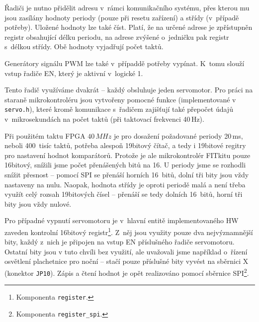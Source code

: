 Řadiči je nutno přidělit adresu v~rámci komunikačního systému, přes kterou mu
jsou zasílány hodnoty periody (pouze při resetu zařízení) a střídy (v~případě
potřeby). Uložené hodnoty lze také číst. Platí, že na určené adrese je
zpřístupněn registr obsahující délku periodu, na adrese zvýšené o~jedničku pak
registr s~délkou střídy. Obě hodnoty vyjadřují počet taktů.

Generátory signálu PWM lze také v~případdě potřeby vypínat. K~tomu slouží vstup
řadiče EN, který je aktivní v~logické 1.

Tento řadič využíváme dvakrát -- každý obsluhuje jeden servomotor. Pro práci na
staraně mikrokontroléru jsou vytvořeny pomocné funkce (implementované v
\texttt{servo.h}), které kromě komunikace s~řadičem zajišťují také přepočet
údajů v~mikrosekundách na počet taktů (při taktovací frekvenci 40\,Hz).

Při použitém taktu FPGA $40\,MHz$ je pro dosažení požadované periody 20\,ms,
neboli 400~tisíc taktů, potřeba alespoň 19bitový čítač, a tedy i 19bitové
regitry pro nastavení hodnot komparátorů. Protože je ale mikrokontrolér FITkitu
pouze 16bitový, snížili jsme počet přenášených bitů na 16. U periody jsme se
rozhodli snížit přesnost -- pomocí SPI se přenáší horních 16~bitů, dolní tři
bity jsou vždy nastaveny na nulu. Naopak, hodnota střídy je oproti periodě malá
a není třeba využít celý rozsah 19bitových čísel -- přenáší se tedy dolních
16~bitů, horní tři bity jsou vždy nulové.

Pro případné vypnutí servomotoru je v~hlavní entitě implementovaného HW zaveden
kontrolní 16bitový registr\footnote{Komponenta \texttt{register}.}. Z~něj jsou
využity pouze dva nejvýznamnější bity, každý z~nich je připojen na vstup EN
příslušného řadiče servomotoru. Ostatní bity jsou v tuto chvíli bez využití, ale
uvažovali jsme například o~řízení osvětlení plachetnice pro noční  --
stačí pouze příslušné bity vyvést na sběrnici X (konektor \texttt{JP10}). Zápis
a čtení hodnot je opět realizováno pomocí sběrnice SPI\footnote{Komponenta
\texttt{register\_spi}.}.



